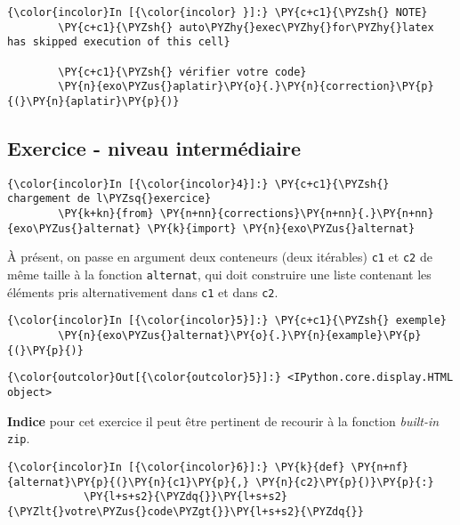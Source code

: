     \begin{Verbatim}[commandchars=\\\{\}]
{\color{incolor}In [{\color{incolor} }]:} \PY{c+c1}{\PYZsh{} NOTE}
        \PY{c+c1}{\PYZsh{} auto\PYZhy{}exec\PYZhy{}for\PYZhy{}latex has skipped execution of this cell}
        
        \PY{c+c1}{\PYZsh{} vérifier votre code}
        \PY{n}{exo\PYZus{}aplatir}\PY{o}{.}\PY{n}{correction}\PY{p}{(}\PY{n}{aplatir}\PY{p}{)}
\end{Verbatim}


    \hypertarget{exercice---niveau-intermuxe9diaire}{%
\subsection{Exercice - niveau
intermédiaire}\label{exercice---niveau-intermuxe9diaire}}

    \begin{Verbatim}[commandchars=\\\{\}]
{\color{incolor}In [{\color{incolor}4}]:} \PY{c+c1}{\PYZsh{} chargement de l\PYZsq{}exercice}
        \PY{k+kn}{from} \PY{n+nn}{corrections}\PY{n+nn}{.}\PY{n+nn}{exo\PYZus{}alternat} \PY{k}{import} \PY{n}{exo\PYZus{}alternat}
\end{Verbatim}


    À présent, on passe en argument deux conteneurs (deux itérables)
\texttt{c1} et \texttt{c2} de même taille à la fonction
\texttt{alternat}, qui doit construire une liste contenant les éléments
pris alternativement dans \texttt{c1} et dans \texttt{c2}.

    \begin{Verbatim}[commandchars=\\\{\}]
{\color{incolor}In [{\color{incolor}5}]:} \PY{c+c1}{\PYZsh{} exemple}
        \PY{n}{exo\PYZus{}alternat}\PY{o}{.}\PY{n}{example}\PY{p}{(}\PY{p}{)}
\end{Verbatim}


\begin{Verbatim}[commandchars=\\\{\}]
{\color{outcolor}Out[{\color{outcolor}5}]:} <IPython.core.display.HTML object>
\end{Verbatim}
            
    \textbf{Indice} pour cet exercice il peut être pertinent de recourir à
la fonction \emph{built-in} \texttt{zip}.

    \begin{Verbatim}[commandchars=\\\{\}]
{\color{incolor}In [{\color{incolor}6}]:} \PY{k}{def} \PY{n+nf}{alternat}\PY{p}{(}\PY{n}{c1}\PY{p}{,} \PY{n}{c2}\PY{p}{)}\PY{p}{:}
            \PY{l+s+s2}{\PYZdq{}}\PY{l+s+s2}{\PYZlt{}votre\PYZus{}code\PYZgt{}}\PY{l+s+s2}{\PYZdq{}}
\end{Verbatim}


